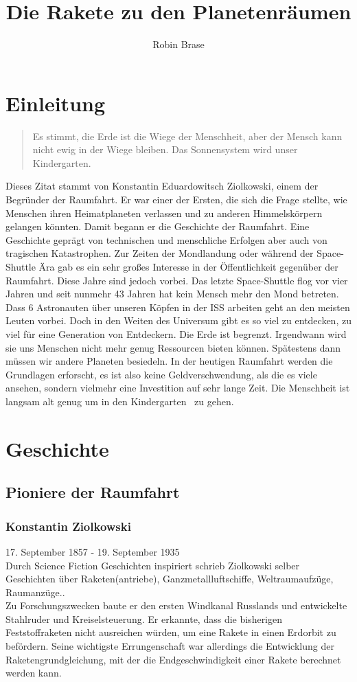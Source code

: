 \documentclass[12pt,a4paper]{article}
\author{Robin Brase}
\title{Die Rakete zu den Planetenräumen}
\begin{document}
\maketitle
\newpage
\tableofcontents
\newpage

\section{Einleitung}
\begin{quote}
Es stimmt, die Erde ist die Wiege der Menschheit, aber der Mensch kann nicht ewig in der Wiege bleiben. Das Sonnensystem wird unser Kindergarten.
\end{quote}
Dieses Zitat stammt von Konstantin Eduardowitsch Ziolkowski, einem der Begründer der Raumfahrt. Er war einer der Ersten, die sich die Frage stellte, wie Menschen ihren Heimatplaneten verlassen und zu anderen Himmelskörpern gelangen könnten.  Damit begann er die Geschichte der Raumfahrt. Eine Geschichte geprägt von technischen und menschliche Erfolgen aber auch von tragischen Katastrophen. Zur Zeiten der Mondlandung oder während der Space-Shuttle Ära gab es ein sehr großes Interesse in der Öffentlichkeit gegenüber der Raumfahrt. Diese Jahre sind jedoch vorbei. Das letzte Space-Shuttle flog vor vier Jahren und seit nunmehr  43 Jahren hat kein Mensch mehr den Mond betreten. Dass 6 Astronauten über unseren Köpfen in der ISS arbeiten geht an den meisten Leuten vorbei. Doch in den Weiten des Universum gibt es so viel zu entdecken, zu viel für eine Generation von Entdeckern. Die Erde ist begrenzt. Irgendwann wird sie uns Menschen nicht mehr genug Ressourcen bieten können. Spätestens dann müssen wir andere Planeten besiedeln. In der heutigen Raumfahrt werden die Grundlagen erforscht, es ist also keine Geldverschwendung, als die es viele ansehen, sondern vielmehr eine Investition auf sehr lange Zeit. Die Menschheit ist langsam alt genug um in den \glqq Kindergarten\grqq~ zu gehen.\\ 
\section{Geschichte}
\subsection{Pioniere der Raumfahrt}
\subsubsection{Konstantin Ziolkowski}
17. September 1857 - 19. September 1935\\
Durch Science Fiction Geschichten inspiriert schrieb Ziolkowski selber Geschichten über Raketen(antriebe), Ganzmetallluftschiffe, Weltraumaufzüge, Raumanzüge..\\ Zu Forschungszwecken baute er den ersten Windkanal Russlands
und entwickelte Stahlruder und Kreiselsteuerung. Er erkannte, dass die bisherigen Feststoffraketen nicht ausreichen würden, um eine Rakete in einen Erdorbit zu befördern. Seine wichtigste Errungenschaft war allerdings die Entwicklung der Raketengrundgleichung, mit der die Endgeschwindigkeit einer Rakete berechnet werden kann.
\end{document}

